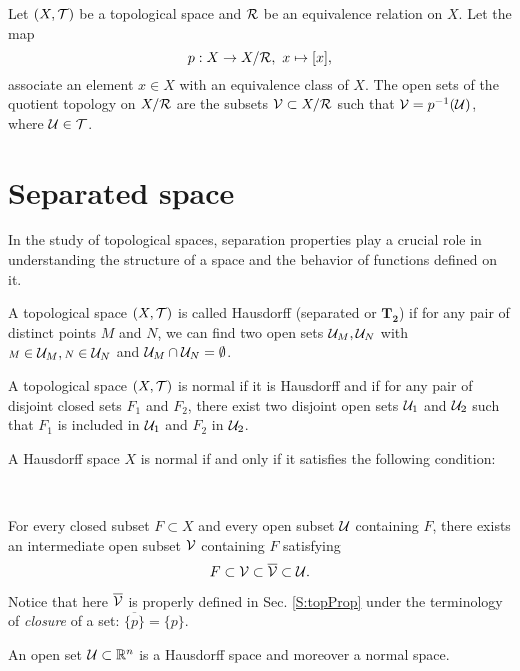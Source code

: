 \begin{definition}
Let $(X,\mathcal{T})$ be a topological space and $\mathcal{R}$ be an equivalence relation on $X$. Let the map 
\[
p : X\to X/\mathcal{R},\ x\mapsto [x],
\]
 associate an element $x\in X$ with an equivalence class of $X$. The open sets of the quotient topology on $X/\mathcal{R}$ are the subsets $\mathcal{V}\subset X/\mathcal{R}$ such that $\mathcal{V}=p^{-1}(\mathcal{U})$, where $\mathcal{U}\in \mathcal{T}$. \end{definition}

\section{Separated space}
In the study of topological spaces, separation properties play a crucial role in understanding the structure of a space and the behavior of functions defined on it.
\begin{definition} 

A topological space $(X,\mathcal{T})$ is called Hausdorff (separated or $\mathbf{T_2}$) if for any pair of distinct points ${\scriptstyle M}$ and ${\scriptstyle N}$, we can find two open sets $\mathcal{U}_{M}, \mathcal{U}_{N}$ with ${\scriptstyle M}\in\mathcal{U}_{M} , {\scriptstyle N}\in\mathcal{U}_{N}$ and $\mathcal{U}_{M}\cap \mathcal{U}_{N}=\emptyset$.
\end{definition}

\begin{definition}
 A topological space $(X,\mathcal{T})$ is normal if it is Hausdorff and if for any pair of disjoint closed sets $ F_{1}$ and $F_{2}$, there exist two disjoint open sets $\mathcal{U}_{1}$ and $\mathcal{U}_{2}$ such that $F_{1}$ is included in $\mathcal{U}_{1}$ and $F_{2}$ in $\mathcal{U}_{2}$.
\end{definition} 

\begin{theorem} A Hausdorff space $X$ is normal if and only if it satisfies the following condition:

\, 

For every closed subset $F\subset X$ and every open subset $\mathcal{U}$ containing $F$, there exists an intermediate open subset $\mathcal{V}$ containing $F$ satisfying %
\[F\subset \mathcal{V}\subset \overline {\mathcal{V}} \subset \mathcal{U}.\] 
\end{theorem}
Notice that here $\overline {\mathcal{V}} $ is properly defined in Sec. \ref{S:topProp} under the terminology of \emph{closure} of a set: $\overline{\{p\}}=\{p\}$.  
\begin{example}
An open set $\mathcal{U}\subset \mathbb{R}^{n}$ is a Hausdorff space and moreover a normal space.
\end{example}

